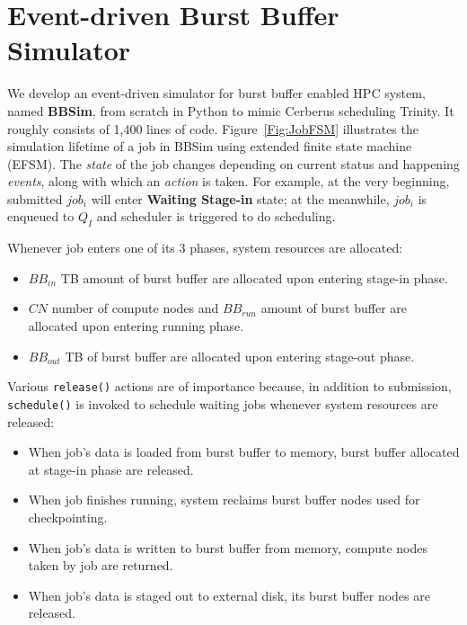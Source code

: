 \section{Event-driven Burst Buffer Simulator}
\label{Sec:Simulation}

We develop an event-driven simulator for burst buffer enabled HPC system, named \textbf{BBSim},
from scratch in Python to mimic Cerberus scheduling Trinity.
It roughly consists of 1,400 lines of code.
Figure~\ref{Fig:JobFSM} illustrates the simulation lifetime of a job in BBSim
using extended finite state machine (EFSM).
The \textit{state} of the job changes depending on current status and
happening \textit{events}, along with which an \textit{action} is taken.
For example, at the very beginning, submitted $job_i$ will enter \textbf{Waiting Stage-in} state;
at the meanwhile, $job_i$ is enqueued to $Q_I$ and scheduler is triggered to do scheduling.

Whenever job enters one of its 3 phases, system resources are allocated:
\begin{itemize}
        \item $BB_{in}$ TB amount of burst buffer are allocated upon entering stage-in phase.
        \item $CN$ number of compute nodes and $BB_{run}$ amount of burst buffer
                are allocated upon entering running phase.
        \item $BB_{out}$ TB of burst buffer are allocated upon entering stage-out phase.
\end{itemize}
Various \texttt{release()} actions are of importance because, in addition to submission,
\texttt{schedule()} is invoked to schedule waiting jobs
whenever system resources are released:
\begin{itemize}
        \item When job's data is loaded from burst buffer to memory,
                burst buffer allocated at stage-in phase are released.
        \item When job finishes running, system reclaims burst buffer nodes
                used for checkpointing.
        \item When job's data is written to burst buffer from memory,
                compute nodes taken by job are returned.
        \item When job's data is staged out to external disk,
                its burst buffer nodes are released.
\end{itemize}

